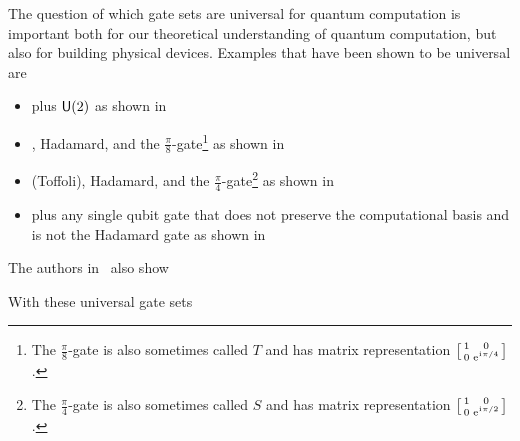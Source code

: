 The question of which gate sets are universal for quantum computation is important both for our theoretical understanding of quantum computation, but also for building physical devices.
Examples that have been shown to be universal are
\begin{itemize}
    \item \CNOT{} plus $\mathsf{U} (2)$ as shown in~\cite{universal-cnot-u2}
    \item \CNOT{}, Hadamard, and the $\frac{\pi}{8}$-gate\footnote{The $\frac{\pi}{8}$-gate is also sometimes called $T$ and has matrix representation $\smqty[1 & 0 \\ 0 & \e^{\iu\pi/4}]$.} as shown in~\cite{universal-cnot-had-p8}
    \item \CCNOT{} (Toffoli), Hadamard, and the $\frac{\pi}{4}$-gate\footnote{The $\frac{\pi}{4}$-gate is also sometimes called $S$ and has matrix representation $\smqty[1 & 0 \\ 0 & \e^{\iu\pi/2}]$.} as shown in~\cite{universal-ccnot-had-p4}
    \item \CNOT{} plus any single qubit gate that does not preserve the computational basis and is not the Hadamard gate as shown in~\cite{universal-cnot-basis-change}
\end{itemize}

The authors in~\cite{universal-cnot-u2} also show

With these universal gate sets



